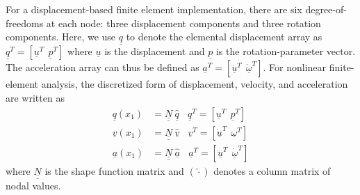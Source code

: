 \documentclass{aiaa-tc}
\newcommand{\tens}[1]{\underline{\underline{#1}}}
\renewcommand{\vec}[1]{\underline{#1}}
\begin{document}
For a displacement-based finite element implementation, there are six
degree-of-freedoms at each node: three displacement components and three
rotation components. Here, we use $\vec{q}$ to denote the elemental
displacement array as $\underline{q}^T=\left[
\underline{u}^T~~\underline{p}^T\right]$ where $\vec{u}$ is the
displacement and $\vec{p}$ is the rotation-parameter vector. The
acceleration array can thus be defined as $\underline{a}^T=\left[
\ddot{\underline{u}}^T~~ \dot{\underline{\omega}}^T \right]$. For nonlinear
finite-element analysis, the discretized form of
displacement, velocity, and acceleration are written as
\begin{align}
	\label{DiscretizedDisp}
	\underline{q} (x_1) &= \underline{\underline{N}} ~\hat{\underline{q}}~~~~\underline{q}^T = \left[ \underline{u}^T~~\underline{p}^T \right] \\
	\label{DiscretizedVel}
	\underline{v}(x_1) &= \underline{\underline{N}}~\hat{\underline{v}}~~~~\underline{v}^T = \left[\underline{\dot{u}}^T~~\underline{\omega}^T \right] \\
	\label{DiscretizedAcc}
	\underline{a}(x_1) &= \underline{\underline{N}}~ \hat{\underline{a}}~~~~\underline{a}^T = \left[ \ddot{\underline{u}}^T~~\dot{\underline{\omega}}^T \right]	
\end{align}
where $\tens{N}$ is the shape function matrix and $(\hat{\cdot})$ denotes a
column matrix of nodal values.
\end{document}
